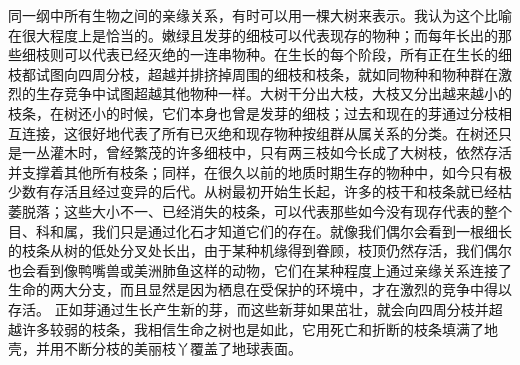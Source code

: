 \documentclass{article}
\begin{document}
同一纲中所有生物之间的亲缘关系，有时可以用一棵大树来表示。我认为这个比喻在很大程度上是恰当的。嫩绿且发芽的细枝可以代表现存的物种；而每年长出的那些细枝则可以代表已经灭绝的一连串物种。在生长的每个阶段，所有正在生长的细枝都试图向四周分枝，超越并排挤掉周围的细枝和枝条，就如同物种和物种群在激烈的生存竞争中试图超越其他物种一样。大树干分出大枝，大枝又分出越来越小的枝条，在树还小的时候，它们本身也曾是发芽的细枝；过去和现在的芽通过分枝相互连接，这很好地代表了所有已灭绝和现存物种按组群从属关系的分类。在树还只是一丛灌木时，曾经繁茂的许多细枝中，只有两三枝如今长成了大树枝，依然存活并支撑着其他所有枝条；同样，在很久以前的地质时期生存的物种中，如今只有极少数有存活且经过变异的后代。从树最初开始生长起，许多的枝干和枝条就已经枯萎脱落；这些大小不一、已经消失的枝条，可以代表那些如今没有现存代表的整个目、科和属，我们只是通过化石才知道它们的存在。就像我们偶尔会看到一根细长的枝条从树的低处分叉处长出，由于某种机缘得到眷顾，枝顶仍然存活，我们偶尔也会看到像鸭嘴兽或美洲肺鱼这样的动物，它们在某种程度上通过亲缘关系连接了生命的两大分支，而且显然是因为栖息在受保护的环境中，才在激烈的竞争中得以存活。 正如芽通过生长产生新的芽，而这些新芽如果茁壮，就会向四周分枝并超越许多较弱的枝条，我相信生命之树也是如此，它用死亡和折断的枝条填满了地壳，并用不断分枝的美丽枝丫覆盖了地球表面。 \\

\newpage
\end{document}
